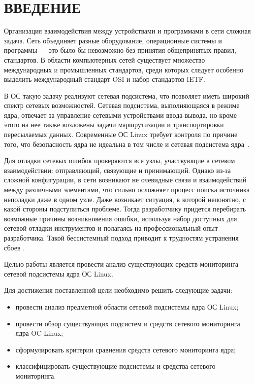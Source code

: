 \section*{\centering ВВЕДЕНИЕ}

Организация взаимодействия между устройствами и программами в сети сложная задача.
Сеть объединяет разные оборудование, операционные системы и программы --- это было бы невозможно без принятия общепринятых правил, стандартов.
В области компьютерных сетей существует множество международных и промышленных стандартов, среди которых следует особенно выделить международный стандарт OSI и набор стандартов IETF.

В ОС такую задачу реализуют сетевая подсистема, что позволяет иметь широкий спектр сетевых возможностей. Сетевая подсистема, выполняющаяся в режиме ядра, отвечает за управление сетевыми устройствами ввода-вывода, но кроме этого на нее также возложены задачи маршрутизации и транспортировки пересылаемых данных.
Современные ОС Linux требует контроля по причине того, что безопасность ядра не идеальна в том числе и сетевая подсистема ядра~\cite{version_kernel_bugs}. 
 
Для отладки сетевых ошибок проверяются все узлы, участвующие в сетевом взаимодействии: отправляющий, связующие и принимающий. Однако из-за сложной конфигурации, в сети возникают не очевидные связи и взаимодействий между различными элементами, что сильно осложняет процесс поиска источника неполадки даже в одном узле. Даже возникает ситуация, в которой непонятно, с какой стороны подступиться проблеме. Тогда разработчику придется перебирать возможные причины возникновения ошибки, используя набор доступных для сетевой отладки инструментов и полагаясь на профессиональный опыт разработчика. Такой бессистемный подход приводит к трудностям устранения сбоев .

Целью работы является провести анализ существующих средств мониторинга сетевой подсистемы ядра ОС Linux.

Для достижения поставленной цели необходимо решить следующие задачи:
\begin{itemize}[label=---]
	\item провести анализ предметной области сетевой подсистемы ядра ОС Linux;
	\item провести обзор существующих подсистем и средств сетевого мониторинга ядра OC Linux;
	\item сформулировать критерии сравнения средств сетевого мониторинга ядра;
	\item классифицировать существующие подсистемы и средства сетевого мониторинга.
\end{itemize}